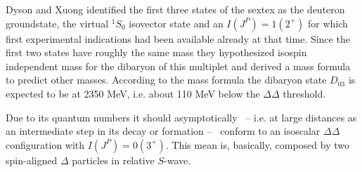 Dyson and Xuong identified the first three states of the sextex as the deuteron groundstate, the virtual
$^{1}S_{0}$ isovector state and an $I(J^{P}) = 1(2^{+})$ for which first experimental indications had been
available already at that time.
Since the first two states have roughly the same mass they hypothesized isospin independent mass for the 
dibaryon of this multiplet and derived a mass formula to predict other masses.
According to the mass formula the dibaryon state $D_{03}$ is expected to be at 2350 MeV, 
i.e. about 110 MeV below the $\Delta \Delta$ threshold.

Due to its quantum numbers it should asymptotically \ -- i.e. at large distances as an intermediate
step in its decay or formation -- \ conform to an isoscalar $\Delta \Delta$configuration with
$I(J^{P}) = 0(3^{+})$. This mean is, basically, composed by two spin-aligned $\Delta$ particles
in relative $S$-wave.


